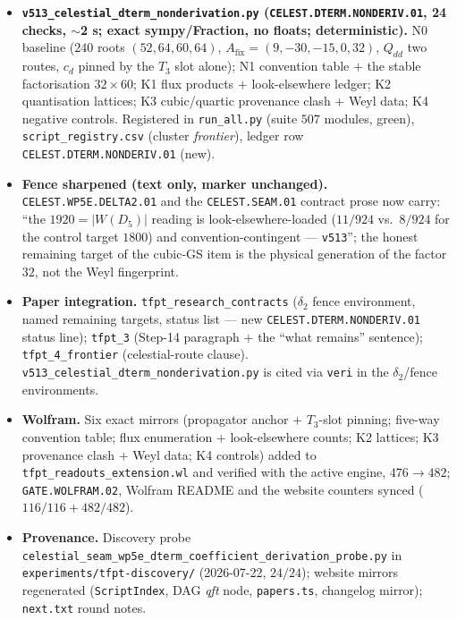 \begin{itemize}[leftmargin=1.5em]
\item \textbf{\texttt{v513\_celestial\_dterm\_nonderivation.py} (\texttt{CELEST.DTERM.NONDERIV.01},
24 checks, $\sim$2 s; exact sympy/Fraction, no floats; deterministic).} N0 baseline ($240$ roots
$(52,64,60,64)$, $A_{\mathrm{fix}}=(9,-30,-15,0,32)$, $Q_{dd}$ two routes, $c_d$ pinned by the
$T_3$ slot alone); N1 convention table $+$ the stable factorisation $32\times60$; K1 flux products
$+$ look-elsewhere ledger; K2 quantisation lattices; K3 cubic/quartic provenance clash $+$ Weyl
data; K4 negative controls. Registered in \texttt{run\_all.py} (suite $507$ modules, green),
\texttt{script\_registry.csv} (cluster \emph{frontier}), ledger row
\texttt{CELEST.DTERM.NONDERIV.01} (new).
\item \textbf{Fence sharpened (text only, marker unchanged).} \texttt{CELEST.WP5E.DELTA2.01} and
the \texttt{CELEST.SEAM.01} contract prose now carry: ``the $1920=|W(D_5)|$ reading is
look-elsewhere-loaded ($11/924$ vs.\ $8/924$ for the control target $1800$) and
convention-contingent --- \texttt{v513}''; the honest remaining target of the cubic-GS item is the
physical generation of the factor $32$, not the Weyl fingerprint.
\item \textbf{Paper integration.} \texttt{tfpt\_research\_contracts} ($\delta_2$ fence environment,
named remaining targets, status list --- new \texttt{CELEST.DTERM.NONDERIV.01} status line);
\texttt{tfpt\_3} (Step-14 paragraph $+$ the ``what remains'' sentence); \texttt{tfpt\_4\_frontier}
(celestial-route clause). \texttt{v513\_celestial\_dterm\_nonderivation.py} is cited via
\texttt{veri} in the $\delta_2$/fence environments.
\item \textbf{Wolfram.} Six exact mirrors (propagator anchor $+$ $T_3$-slot pinning; five-way
convention table; flux enumeration $+$ look-elsewhere counts; K2 lattices; K3 provenance clash $+$
Weyl data; K4 controls) added to \texttt{tfpt\_readouts\_extension.wl} and verified with the
active engine, $476\to482$; \texttt{GATE.WOLFRAM.02}, Wolfram README and the website counters
synced ($116/116+482/482$).
\item \textbf{Provenance.} Discovery probe
\texttt{celestial\_seam\_}\allowbreak\texttt{wp5e\_dterm\_}\allowbreak\texttt{coefficient\_}\allowbreak\texttt{derivation\_probe.py}
in \texttt{experiments/tfpt-discovery/}
(2026-07-22, $24/24$); website mirrors regenerated (\texttt{ScriptIndex}, DAG \emph{qft} node,
\texttt{papers.ts}, changelog mirror); \texttt{next.txt} round notes.
\end{itemize}

